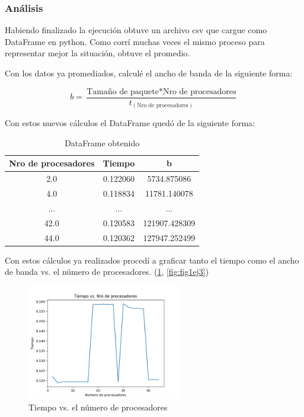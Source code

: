 \subsubsection{Análisis}
Habiendo finalizado la ejecución obtuve un archivo csv que cargue como DataFrame en python. Como corrí muchas veces el mismo proceso para representar mejor la situación, obtuve el promedio.

Con los datos ya promediados, calculé el ancho de banda de la siguiente forma:

$$b = \frac{\text{Tamaño de paquete}*\text{Nro de procesadores}}{t_{(\text{Nro de procesadores})}}$$

Con estos nuevos cálculos el DataFrame quedó de la siguiente forma: 

\begin{table}[h!]
\centering
 \begin{tabular}{|c |c| c|} 
 \hline
        Nro de procesadores &  Tiempo &  b \\
        \hline
        2.0 &    0.122060 &       5734.875086 \\
        \hline
        4.0 &    0.118834 &       11781.140078 \\
        \hline
        ... &    ... &       ... \\
        \hline
        42.0 &    0.120583 &       121907.428309 \\
        \hline
        44.0 &    0.120362 &        127947.252499 \\
 \hline
 \end{tabular}
 \caption{DataFrame obtenido}
\label{fig:dfej3}
\end{table}

Con estos cálculos ya realizados procedí a graficar tanto el tiempo como el ancho de banda vs. el número de procesadores. (\ref{fig:fig2ej3}, \ref{fig:fig1ej3})

\begin{figure}[H]
    \centering
    \includegraphics[width=0.60\textwidth]{Images/ej3/fig2ej3.png}
    \caption{Tiempo vs. el número de procesadores}
    \label{fig:fig2ej3}
\end{figure}

